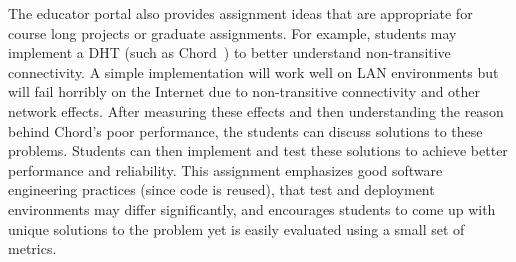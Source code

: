 The educator portal also provides assignment ideas that are appropriate 
for course long projects or graduate assignments.   For example, students 
may implement a DHT (such as Chord~\cite{Stoica_SIGCOMM_2001}) to better 
understand non-transitive connectivity.   A simple implementation will work
well on LAN environments but will fail horribly on the Internet due to 
non-transitive connectivity and other network effects.   After measuring
these effects and then understanding the reason behind Chord's poor 
performance, the students can discuss solutions to these
problems. Students can then implement and test these solutions to achieve
better performance and reliability. 
This assignment emphasizes good software engineering practices (since code is
reused), that test and deployment environments may differ significantly, 
and encourages students to come up with unique solutions to the problem yet 
is easily evaluated using a small set of metrics.



